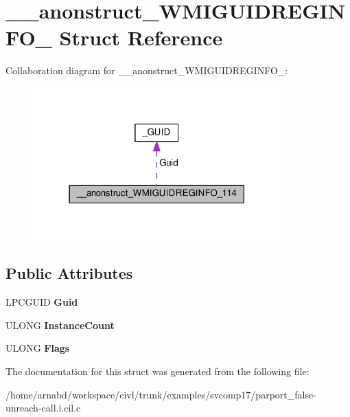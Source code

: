 \hypertarget{struct____anonstruct__WMIGUIDREGINFO__114}{}\section{\+\_\+\+\_\+anonstruct\+\_\+\+W\+M\+I\+G\+U\+I\+D\+R\+E\+G\+I\+N\+F\+O\+\_ Struct Reference}
\label{struct____anonstruct__WMIGUIDREGINFO__114}


Collaboration diagram for \+\_\+\+\_\+anonstruct\+\_\+\+W\+M\+I\+G\+U\+I\+D\+R\+E\+G\+I\+N\+F\+O\+\_\+:
\nopagebreak
\begin{figure}[H]
\begin{center}
\leavevmode
\includegraphics[width=271pt]{struct____anonstruct__WMIGUIDREGINFO__114__coll__graph}
\end{center}
\end{figure}
\subsection*{Public Attributes}
\begin{DoxyCompactItemize}
\item 
\hypertarget{struct____anonstruct__WMIGUIDREGINFO__114_a6dfc344189cc1f0752979a5f237033ed}{}L\+P\+C\+G\+U\+I\+D {\bfseries Guid}\label{struct____anonstruct__WMIGUIDREGINFO__114_a6dfc344189cc1f0752979a5f237033ed}

\item 
\hypertarget{struct____anonstruct__WMIGUIDREGINFO__114_a13dcc22771510d052441544f4c2f0816}{}U\+L\+O\+N\+G {\bfseries Instance\+Count}\label{struct____anonstruct__WMIGUIDREGINFO__114_a13dcc22771510d052441544f4c2f0816}

\item 
\hypertarget{struct____anonstruct__WMIGUIDREGINFO__114_afdc499d1900edc83df2afed4a8301407}{}U\+L\+O\+N\+G {\bfseries Flags}\label{struct____anonstruct__WMIGUIDREGINFO__114_afdc499d1900edc83df2afed4a8301407}

\end{DoxyCompactItemize}


The documentation for this struct was generated from the following file\+:\begin{DoxyCompactItemize}
\item 
/home/arnabd/workspace/civl/trunk/examples/svcomp17/parport\+\_\+false-\/unreach-\/call.\+i.\+cil.\+c\end{DoxyCompactItemize}
